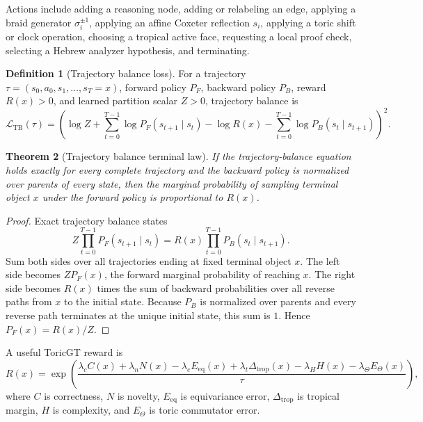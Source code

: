 \documentclass[11pt]{article}
\theoremstyle{definition}
\newtheorem{definition}{Definition}[section]
\theoremstyle{plain}
\newtheorem{theorem}[definition]{Theorem}
\theoremstyle{remark}
\numberwithin{equation}{section}
\begin{document}
Actions include adding a reasoning node, adding or relabeling an edge, applying a braid generator $\sigma_i^{\pm1}$, applying an affine Coxeter reflection $s_i$, applying a toric shift or clock operation, choosing a tropical active face, requesting a local proof check, selecting a Hebrew analyzer hypothesis, and terminating.

\begin{definition}[Trajectory balance loss]
For a trajectory $\tau=(s_0,a_0,s_1,\ldots,s_T=x)$, forward policy $P_F$, backward policy $P_B$, reward $R(x)>0$, and learned partition scalar $Z>0$, trajectory balance is
\begin{equation}
  \mathcal L_{\mathrm{TB}}(\tau)=\left(\log Z+\sum_{t=0}^{T-1}\log P_F(s_{t+1}\mid s_t)-\log R(x)-\sum_{t=0}^{T-1}\log P_B(s_t\mid s_{t+1})\right)^2.
\end{equation}
\end{definition}

\begin{theorem}[Trajectory balance terminal law]
If the trajectory-balance equation holds exactly for every complete trajectory and the backward policy is normalized over parents of every state, then the marginal probability of sampling terminal object $x$ under the forward policy is proportional to $R(x)$.
\end{theorem}

\begin{proof}
Exact trajectory balance states
\begin{equation}
  Z\prod_{t=0}^{T-1}P_F(s_{t+1}\mid s_t)=R(x)\prod_{t=0}^{T-1}P_B(s_t\mid s_{t+1}).
\end{equation}
Sum both sides over all trajectories ending at fixed terminal object $x$.  The left side becomes $ZP_F(x)$, the forward marginal probability of reaching $x$.  The right side becomes $R(x)$ times the sum of backward probabilities over all reverse paths from $x$ to the initial state.  Because $P_B$ is normalized over parents and every reverse path terminates at the unique initial state, this sum is $1$.  Hence $P_F(x)=R(x)/Z$.
\end{proof}

A useful ToricGT reward is
\begin{equation}
  R(x)=\exp\left(\frac{\lambda_c C(x)+\lambda_n N(x)-\lambda_eE_{\mathrm{eq}}(x)+\lambda_t\Delta_{\mathrm{trop}}(x)-\lambda_H H(x)-\lambda_\Theta E_\Theta(x)}{\tau}\right),
\end{equation}
where $C$ is correctness, $N$ is novelty, $E_{\mathrm{eq}}$ is equivariance error, $\Delta_{\mathrm{trop}}$ is tropical margin, $H$ is complexity, and $E_\Theta$ is toric commutator error.
\end{document}
